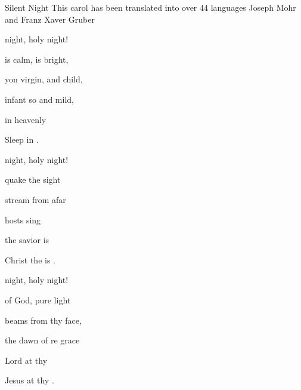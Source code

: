 \begin{SBSong}{Silent Night}
    {This carol has been translated into over 44 languages}
    {Joseph Mohr and Franz Xaver Gruber}
  \begin{SBVerse}
	 night, holy night!

	 is  calm,  is  bright,

	 yon virgin,  and child,

	 infant so  and mild,

	 in  heavenly  

	 Sleep in  . 
  \end{SBVerse}
  \begin{SBVerse}
	 night, holy night!

	 quake  the  sight

	 stream from  afar

	 hosts sing 

	 the savior is  

	Christ the  is . 
  \end{SBVerse}
  \WBPageBrk
  \begin{SBVerse}
	 night, holy night!

	 of  God,  pure  light

	 beams from thy  face,

	 the dawn of re grace

	  Lord at thy  

	Jesus  at thy .
  \end{SBVerse}
\end{SBSong}

